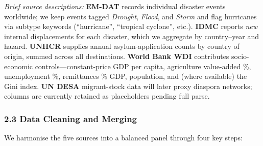 \documentclass[
  11pt,
]{article}
\begin{document}
\emph{Brief source descriptions:} \textbf{EM-DAT} records individual
disaster events worldwide; we keep events tagged \emph{Drought},
\emph{Flood}, and \emph{Storm} and flag hurricanes via subtype keywords
(``hurricane'', ``tropical cyclone'', etc.). \textbf{IDMC} reports
\emph{new} internal displacements for each disaster, which we aggregate
by country--year and hazard. \textbf{UNHCR} supplies annual
asylum-application counts by country of origin, summed across all
destinations. \textbf{World Bank WDI} contributes socio-economic
controls---constant-price GDP per capita, agriculture value-added \%,
unemployment \%, remittances \% GDP, population, and (where available)
the Gini index. \textbf{UN DESA} migrant-stock data will later proxy
diaspora networks; columns are currently retained as placeholders
pending full parse.

\subsubsection{2.3 Data Cleaning and
Merging}\label{data-cleaning-and-merging}

We harmonise the five sources into a balanced panel through four key
steps:
\end{document}
